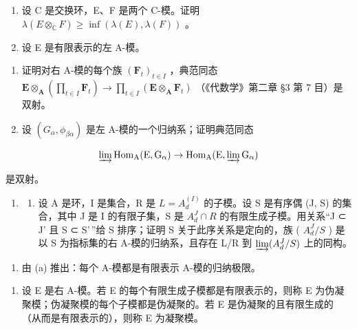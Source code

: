 \begin{enumerate}
\def\labelenumi{\arabic{enumi}.}
\setcounter{enumi}{7}
\item
设 C 是交换环，E、F 是两个 C-模。证明 \(\lambda(E \otimes_{\mathbb{C}} F) \geqslant \inf(\lambda(E), \lambda(F))\) 。
\item
设 E 是有限表示的左 A-模。
\end{enumerate}

\begin{enumerate}
\def\labelenumi{(\alph{enumi})}
\item
证明对右 A-模的每个族 \((\mathbf{F}_t)_{t \in I}\) ，典范同态 \(\mathbf{E} \otimes_{\mathbf{A}} \left( \prod_{t \in I} \mathbf{F}_t \right) \to \prod_{t \in I} (\mathbf{E} \otimes_{\mathbf{A}} \mathbf{F}_t)\) （《代数学》第二章 §3 第 7 目）是双射。
\item
设 \((G_{\alpha}, \phi_{\beta\alpha})\) 是左 A-模的一个归纳系；证明典范同态
\end{enumerate}

\[
\varinjlim \operatorname{Hom} _ {\mathrm{A}} (\mathrm{E}, \mathrm{G} _ {\alpha}) \rightarrow \operatorname{Hom} _ {\mathrm{A}} (\mathrm{E}, \varinjlim \mathrm{G} _ {\alpha})
\]

是双射。

\begin{enumerate}
\def\labelenumi{\arabic{enumi}.}
\setcounter{enumi}{9}
\tightlist
\item
  \begin{enumerate}
  \def\labelenumii{(\alph{enumii})}
  \tightlist
  \item
  设 A 是环，I 是集合，R 是 \(L = A_{d}^{(I)}\) 的子模。设 S 是有序偶 (J, S) 的集合，其中 J 是 I 的有限子集，S 是 \(A_{d}^{J} \cap R\) 的有限生成子模。用关系``J ⊂ J' 且 S ⊂ S'\,''给 S 排序；证明 S 关于此序关系是定向的，族 ( \(A_{d}^{J}/S\) ) 是以 S 为指标集的右 A-模的归纳系，且存在 L/R 到 \(\varinjlim (A_{d}^{J}/S)\) 上的同构。
  \end{enumerate}
\end{enumerate}

\begin{enumerate}
\def\labelenumi{(\alph{enumi})}
\setcounter{enumi}{1}
\tightlist
\item
由 (a) 推出：每个 A-模都是有限表示 A-模的归纳极限。
\end{enumerate}

\begin{enumerate}
\def\labelenumi{\arabic{enumi}.}
\setcounter{enumi}{10}
\tightlist
\item
设 E 是右 A-模。若 E 的每个有限生成子模都是有限表示的，则称 E 为伪凝聚模；伪凝聚模的每个子模都是伪凝聚的。若 E 是伪凝聚的且有限生成的（从而是有限表示的），则称 E 为凝聚模。
\end{enumerate}

